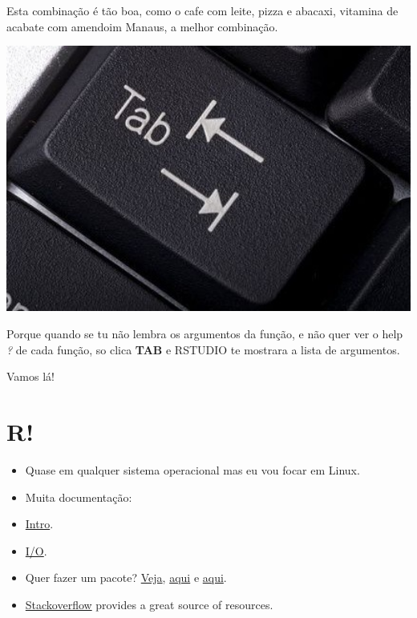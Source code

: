 \documentclass[]{book}
\providecommand{\tightlist}{%
  \setlength{\itemsep}{0pt}\setlength{\parskip}{0pt}}
\theoremstyle{definition}
\theoremstyle{definition}
\theoremstyle{definition}
\theoremstyle{remark}
\begin{document}
Esta combinação é tão boa, como o cafe com leite, pizza e abacaxi,
vitamina de acabate com amendoim Manaus, a melhor combinação.

\includegraphics[width=5.88in]{figuras/tab-key-}

Porque quando se tu não lembra os argumentos da função, e não quer ver o
help \emph{?} de cada função, so clica \textbf{TAB} e RSTUDIO te
mostrara a lista de argumentos.

Vamos lá!

\chapter{R!}\label{r}

\begin{itemize}
\tightlist
\item
  Quase em qualquer sistema operacional mas eu vou focar em Linux.
\item
  Muita documentação:
\item
  \href{http://cran.r-project.org/doc/manuals/r-release/R-intro.html}{Intro}.
\item
  \href{http://cran.r-project.org/doc/manuals/r-release/R-data.html}{I/O}.
\item
  Quer fazer um pacote?
  \href{http://cran.r-project.org/doc/manuals/r-release/R-exts.html}{Veja},
  \href{http://cran.r-project.org/doc/manuals/r-release/R-ints.html}{aqui}
  e
  \href{http://cran.r-project.org/doc/manuals/r-release/R-lang.html}{aqui}.
\item
  \href{https://stackoverflow.com/questions/tagged/r}{Stackoverflow}
  provides a great source of resources.
\end{itemize}
\end{document}

